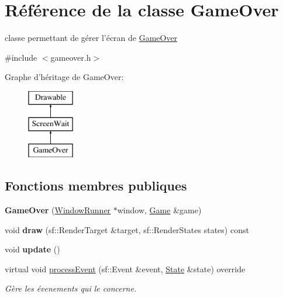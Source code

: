 \hypertarget{class_game_over}{\section{Référence de la classe Game\+Over}
\label{class_game_over}
}


classe permettant de gérer l'écran de \hyperlink{class_game_over}{Game\+Over}  




{\ttfamily \#include $<$gameover.\+h$>$}

Graphe d'héritage de Game\+Over\+:\begin{figure}[H]
\begin{center}
\leavevmode
\includegraphics[height=3.000000cm]{class_game_over}
\end{center}
\end{figure}
\subsection*{Fonctions membres publiques}
\begin{DoxyCompactItemize}
\item 
\hypertarget{class_game_over_add968900f96ba0ea2ab37b6edf51178c}{{\bfseries Game\+Over} (\hyperlink{class_window_runner}{Window\+Runner} $\ast$window, \hyperlink{class_game}{Game} \&game)}\label{class_game_over_add968900f96ba0ea2ab37b6edf51178c}

\item 
\hypertarget{class_game_over_a761ac69c03c3b7c13b3192984a2e4645}{void {\bfseries draw} (sf\+::\+Render\+Target \&target, sf\+::\+Render\+States states) const }\label{class_game_over_a761ac69c03c3b7c13b3192984a2e4645}

\item 
\hypertarget{class_game_over_a69f9e1364ff7caa8b17184441474c8b7}{void {\bfseries update} ()}\label{class_game_over_a69f9e1364ff7caa8b17184441474c8b7}

\item 
virtual void \hyperlink{class_game_over_a199d913ab7b86f03920d3d1c8ad97419}{process\+Event} (sf\+::\+Event \&event, \hyperlink{gamestate_8h_a5d74787dedbc4e11c1ab15bf487e61f8}{State} \&state) override
\begin{DoxyCompactList}\small\item\em Gère les évenements qui le concerne. \end{DoxyCompactList}\end{DoxyCompactItemize}


